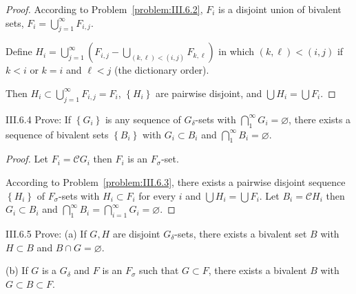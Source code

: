 \begin{proof}
    According to Problem~\ref{problem:III.6.2}, \( F_{i} \) is a disjoint union of bivalent sets, \( F_{i} = \bigcup^{\infty}_{j=1} F_{i,j} \).

    Define \( H_{i} = \bigcup^{\infty}_{j=1} \left(F_{i,j} - \bigcup_{(k,\ell) < (i,j)} F_{k,\ell}\right) \) in which \( (k,\ell) < (i,j) \) if \( k < i \) or \( k = i \) and \( \ell < j \) (the dictionary order).

    Then \( H_{i} \subset \bigcup^{\infty}_{j=1} F_{i,j} = F_{i} \), \( \left\{ H_{i} \right\} \) are pairwise disjoint, and \( \bigcup H_{i} = \bigcup F_{i} \).
\end{proof}

\begin{problem}{III.6.4}\label{problem:III.6.4}
Prove: If \( \left\{ G_{i} \right\} \) is any sequence of \(G_{\delta}\)-sets with \( \bigcap^{\infty}_{1} G_{i} = \varnothing \), there exists a sequence of bivalent sets \( \left\{ B_{i} \right\} \) with \(G_{i} \subset B_{i}\) and \( \bigcap^{\infty}_{1} B_{i} = \varnothing \).
\end{problem}

\begin{proof}
    Let \( F_{i} = \mathscr{C}G_{i} \) then \( F_{i} \) is an \( F_{\sigma} \)-set.

    According to Problem~\ref{problem:III.6.3}, there exists a pairwise disjoint sequence \( \left\{ H_{i} \right\} \) of \(F_{\sigma}\)-sets with \(H_{i} \subset F_{i}\) for every \(i\) and \( \bigcup H_{i} = \bigcup F_{i} \). Let \( B_{i} = \mathscr{C}H_{i} \) then \( G_{i} \subset B_{i} \) and \( \bigcap^{\infty}_{1} B_{i} = \bigcap^{\infty}_{i=1} G_{i} = \varnothing \).
\end{proof}

\begin{problem}{III.6.5}
Prove: (a) If \(G, H\) are disjoint \(G_{\delta}\)-sets, there exists a bivalent set \(B\) with \(H \subset B\) and \( B \cap G = \varnothing \).

(b) If \(G\) is a \(G_{\delta}\) and \(F\) is an \(F_{\sigma}\) such that \(G \subset F\), there exists a bivalent \(B\) with \( G \subset B \subset F \).
\end{problem}

